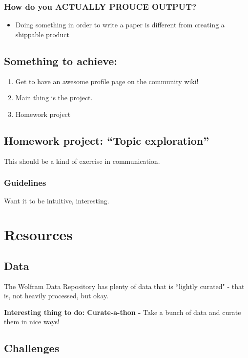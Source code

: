 \documentclass[11pt]{article}
\theoremstyle{definition}
\begin{document}
\subsubsection{How do you ACTUALLY PROUCE OUTPUT?}
\begin{itemize}
\item Doing something in order to write a paper is different from creating a shippable product
\end{itemize}

\subsection{Something to achieve:}
\begin{enumerate}
\item Get to have an awesome profile page on the community wiki!
\item Main thing is the project.
\item Homework project
\end{enumerate}



\subsection{Homework project: “Topic exploration”}
This should be a kind of exercise in communication.

\subsubsection{Guidelines}

Want it to be intuitive, interesting. 

\section{Resources}

\subsection{Data}

The Wolfram Data Repository has plenty of data that is ``lightly curated" - that is, not heavily processed, but okay.

\textbf{Interesting thing to do: Curate-a-thon - } Take a bunch of data and curate them in nice ways!

\subsection{Challenges}
\end{document}
